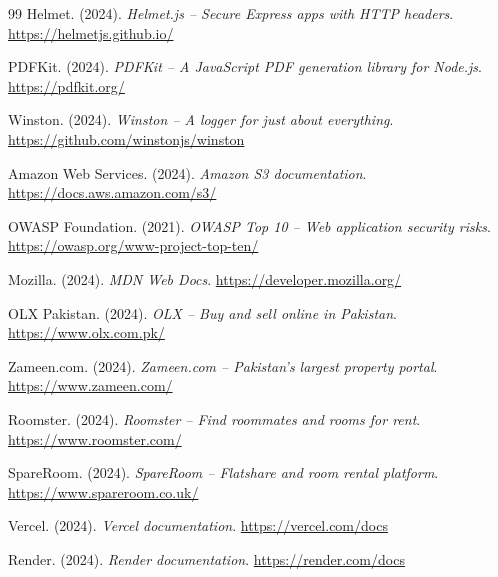 \begin{thebibliography}{99}
Helmet. (2024). \textit{Helmet.js -- Secure Express apps with HTTP headers}. \url{https://helmetjs.github.io/}

PDFKit. (2024). \textit{PDFKit -- A JavaScript PDF generation library for Node.js}. \url{https://pdfkit.org/}

Winston. (2024). \textit{Winston -- A logger for just about everything}. \url{https://github.com/winstonjs/winston}

Amazon Web Services. (2024). \textit{Amazon S3 documentation}. \url{https://docs.aws.amazon.com/s3/}

OWASP Foundation. (2021). \textit{OWASP Top 10 -- Web application security risks}. \url{https://owasp.org/www-project-top-ten/}

Mozilla. (2024). \textit{MDN Web Docs}. \url{https://developer.mozilla.org/}

OLX Pakistan. (2024). \textit{OLX -- Buy and sell online in Pakistan}. \url{https://www.olx.com.pk/}

Zameen.com. (2024). \textit{Zameen.com -- Pakistan's largest property portal}. \url{https://www.zameen.com/}

Roomster. (2024). \textit{Roomster -- Find roommates and rooms for rent}. \url{https://www.roomster.com/}

SpareRoom. (2024). \textit{SpareRoom -- Flatshare and room rental platform}. \url{https://www.spareroom.co.uk/}

Vercel. (2024). \textit{Vercel documentation}. \url{https://vercel.com/docs}

Render. (2024). \textit{Render documentation}. \url{https://render.com/docs}

\end{thebibliography}
